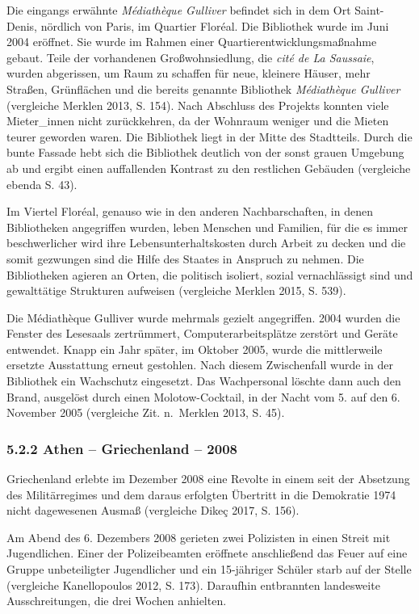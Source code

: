 \documentclass[a4paper,
fontsize=11pt,
oneside,
numbers=noperiodatend,
parskip=half-,
bibliography=totoc,
final
]{scrartcl}
\begin{document}
Die eingangs erwähnte \emph{Médiathèque Gulliver} befindet sich in dem
Ort Saint-Denis, nördlich von Paris, im Quartier Floréal. Die Bibliothek
wurde im Juni 2004 eröffnet. Sie wurde im Rahmen einer
Quartierentwicklungsmaßnahme gebaut. Teile der vorhandenen
Großwohnsiedlung, die \emph{cité de La Saussaie}, wurden abgerissen, um
Raum zu schaffen für neue, kleinere Häuser, mehr Straßen, Grünflächen
und die bereits genannte Bibliothek \emph{Médiathèque Gulliver}
(vergleiche Merklen 2013, S. 154). Nach Abschluss des Projekts konnten
viele Mieter\_innen nicht zurückkehren, da der Wohnraum weniger und die
Mieten teurer geworden waren. Die Bibliothek liegt in der Mitte des
Stadtteils. Durch die bunte Fassade hebt sich die Bibliothek deutlich
von der sonst grauen Umgebung ab und ergibt einen auffallenden Kontrast
zu den restlichen Gebäuden (vergleiche ebenda S. 43).

Im Viertel Floréal, genauso wie in den anderen Nachbarschaften, in denen
Bibliotheken angegriffen wurden, leben Menschen und Familien, für die es
immer beschwerlicher wird ihre Lebensunterhaltskosten durch Arbeit zu
decken und die somit gezwungen sind die Hilfe des Staates in Anspruch zu
nehmen. Die Bibliotheken agieren an Orten, die politisch isoliert,
sozial vernachlässigt sind und gewalttätige Strukturen aufweisen
(vergleiche Merklen 2015, S. 539).

Die Médiathèque Gulliver wurde mehrmals gezielt angegriffen. 2004 wurden
die Fenster des Lesesaals zertrümmert, Computerarbeitsplätze zerstört
und Geräte entwendet. Knapp ein Jahr später, im Oktober 2005, wurde die
mittlerweile ersetzte Ausstattung erneut gestohlen. Nach diesem
Zwischenfall wurde in der Bibliothek ein Wachschutz eingesetzt. Das
Wachpersonal löschte dann auch den Brand, ausgelöst durch einen
Molotow-Cocktail, in der Nacht vom 5. auf den 6. November 2005
(vergleiche Zit. n.~Merklen 2013, S. 45).

\hypertarget{athen-griechenland-2008}{%
\subsubsection{5.2.2 Athen -- Griechenland --
2008}\label{athen-griechenland-2008}}

Griechenland erlebte im Dezember 2008 eine Revolte in einem seit der
Absetzung des Militärregimes und dem daraus erfolgten Übertritt in die
Demokratie 1974 nicht dagewesenen Ausmaß (vergleiche Dikeç 2017, S.
156).

Am Abend des 6. Dezembers 2008 gerieten zwei Polizisten in einen Streit
mit Jugendlichen. Einer der Polizeibeamten eröffnete anschließend das
Feuer auf eine Gruppe unbeteiligter Jugendlicher und ein 15-jähriger
Schüler starb auf der Stelle (vergleiche Kanellopoulos 2012, S. 173).
Daraufhin entbrannten landesweite Ausschreitungen, die drei Wochen
anhielten.
\end{document}
